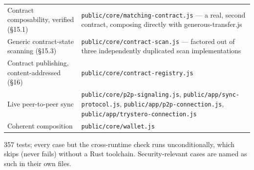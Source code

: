 \documentclass[10pt]{article}
\newcommand{\code}[1]{\texttt{\small #1}}
\begin{document}
\begin{center}
\begin{tabular}{@{}p{5cm}p{9.5cm}@{}}
Contract composability, verified (\S15.1) & \code{public/core/matching-contract.js} --- a real, second contract, composing directly with generous-transfer.js \\
Generic contract-state scanning (\S15.3) & \code{public/core/contract-scan.js} --- factored out of three independently duplicated scan implementations \\
Contract publishing, content-addressed (\S16) & \code{public/core/contract-registry.js} \\
Live peer-to-peer sync & \code{public/core/p2p-signaling.js}, \code{public/app/sync-protocol.js}, \code{public/app/p2p-connection.js}, \code{public/app/trystero-connection.js} \\
Coherent composition & \code{public/core/wallet.js} \\
\bottomrule
\end{tabular}
\end{center}

357 tests; every case but the cross-runtime check runs unconditionally, which skips (never fails) without a Rust toolchain. Security-relevant cases are named as such in their own files.
\end{document}
